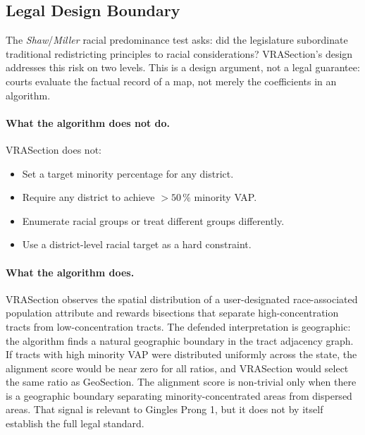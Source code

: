 \subsection{Legal Design Boundary}
\label{sec:legal-analysis}

The \emph{Shaw}/\emph{Miller} racial predominance test asks:
did the legislature subordinate traditional redistricting principles
to racial considerations?
VRASection's design addresses this risk on two levels.  This is a design
argument, not a legal guarantee: courts evaluate the factual record of a map,
not merely the coefficients in an algorithm.

\paragraph{What the algorithm does not do.}
VRASection does not:
\begin{itemize}
\item Set a target minority percentage for any district.
\item Require any district to achieve $> 50\,\%$ minority VAP.
\item Enumerate racial groups or treat different groups differently.
\item Use a district-level racial target as a hard constraint.
\end{itemize}

\paragraph{What the algorithm does.}
VRASection observes the spatial distribution of a user-designated
race-associated population attribute and rewards bisections that
separate high-concentration tracts from low-concentration tracts.
The defended interpretation is geographic: the algorithm
finds a natural geographic boundary in the tract adjacency graph.
If tracts with high minority VAP were distributed uniformly across
the state, the alignment score would be near zero for all ratios,
and VRASection would select the same ratio as GeoSection.
The alignment score is non-trivial only when there is a geographic
boundary separating minority-concentrated areas from dispersed areas.  That
signal is relevant to Gingles Prong 1, but it does not by itself establish the
full legal standard.

